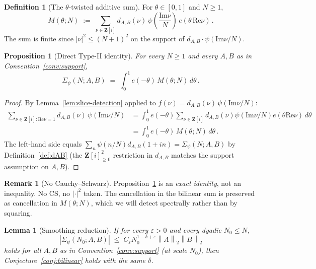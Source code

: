 \documentclass[11pt]{article}
\newtheorem{lemma}[theorem]{Lemma}
\newtheorem{proposition}[theorem]{Proposition}
\theoremstyle{definition}
\newtheorem{definition}[theorem]{Definition}
\newtheorem{remark}[theorem]{Remark}
\newcommand{\Z}{\mathbf{Z}}
\newcommand{\Zi}{\Z[i]}
\renewcommand{\Re}{\mathrm{Re}}
\renewcommand{\Im}{\mathrm{Im}}
\newcommand{\norm}[1]{\left\lVert #1\right\rVert}
\begin{document}
\begin{definition}[The $\theta$-twisted additive sum]\label{def:Mtheta}
For $\theta\in[0,1]$ and $N\ge 1$,
\[
   M(\theta;N)\;:=\;\sum_{\nu\in\Zi}d_{A,B}(\nu)\,\psi\!\left(\frac{\Im\nu}{N}\right)\,e(\theta\,\Re\nu)\,.
\]
The sum is finite since $|\nu|^2\le(N+1)^2$ on the support of $d_{A,B}\cdot\psi(\Im\nu/N)$.
\end{definition}

\begin{proposition}[Direct Type-II identity]\label{prop:typeII-identity}
For every $N\ge 1$ and every $A,B$ as in Convention~\ref{conv:support},
\[
   \Sigma_\psi(N;A,B)\;=\;\int_0^1 e(-\theta)\,M(\theta;N)\,d\theta\,.
\]
\end{proposition}

\begin{proof}
By Lemma~\ref{lem:slice-detection} applied to $f(\nu)=d_{A,B}(\nu)\,\psi(\Im\nu/N)$:
\begin{align*}
   \sum_{\nu\in\Zi:\Re\nu=1}d_{A,B}(\nu)\,\psi(\Im\nu/N)
   &=\int_0^1 e(-\theta)\sum_{\nu\in\Zi}d_{A,B}(\nu)\psi(\Im\nu/N)e(\theta\Re\nu)\,d\theta\\
   &=\int_0^1 e(-\theta)\,M(\theta;N)\,d\theta\,.
\end{align*}
The left-hand side equals $\sum_n\psi(n/N)d_{A,B}(1+in)=\Sigma_\psi(N;A,B)$ by Definition~\ref{def:dAB} (the $\Zi_{\ge 0}^2$ restriction in $d_{A,B}$ matches the support assumption on $A,B$).
\end{proof}

\begin{remark}[No Cauchy--Schwarz]\label{rem:no-CS}
Proposition~\ref{prop:typeII-identity} is an \emph{exact identity}, not an inequality. No CS, no $|\cdot|^2$ taken. The cancellation in the bilinear sum is preserved as cancellation in $M(\theta;N)$, which we will detect spectrally rather than by squaring.
\end{remark}

\begin{lemma}[Smoothing reduction]\label{lem:smoothing}
If for every $\varepsilon>0$ and every dyadic $N_0\le N$,
\[
   |\Sigma_\psi(N_0;A,B)|\;\le\;C_\varepsilon N_0^{1-\delta+\varepsilon}\norm{A}_2\norm{B}_2
\]
holds for all $A,B$ as in Convention~\ref{conv:support} (at scale $N_0$), then Conjecture~\ref{conj:bilinear} holds with the same $\delta$.
\end{lemma}
\end{document}
